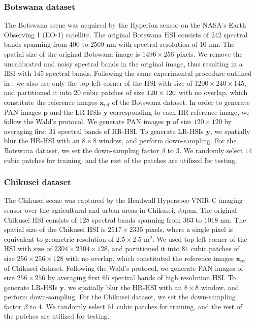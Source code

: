 \documentclass[journal]{IEEEtran}
\begin{document}
        \subsubsection{Botswana dataset} The Botswana scene was acquired by the Hyperion sensor on the NASA's Earth Observing 1 (EO-1) satellite. The original Botswana HSI consists of $242$ spectral bands spanning from $400$ to $2500$ nm with spectral resolution of $10$ nm. The spatial size of the original Botswana image is $1496 \times 256$ pixels. We remove the uncalibrated and noisy spectral bands in the original image, thus resulting in a HSI with $145$ spectral bands. Following the same experimental procedure outlined in \cite{DHP-DARN}, we also use only the top-left corner of the HSI with size of $1200 \times 240 \times 145$, and partitioned it into 20 cubic patches of size $120 \times 120 \time 145$ with no overlap, which constitute the reference images $\mathbf{x}_{\text{ref}}$ of the Botswana dataset. In order to generate PAN images $\mathbf{p}$ and the LR-HSIs $\mathbf{y}$ corresponding to each HR reference image, we follow the Wald's protocol. We generate PAN images $\mathbf{p}$ of size $120 \times 120$ by averaging first $31$ spectral bands of HR-HSI. To generate LR-HSIs $\mathbf{y}$, we spatially blur the HR-HSI with an $8 \times 8$ window, and perform  down-sampling. For the Botswana dataset, we set the down-sampling factor $\beta$ to 3. We randomly select $14$ cubic patches for  training, and the rest of the patches are utilized for  testing.
        
        \subsubsection{Chikusei dataset \cite{Chikusei_dataset}} The Chikusei scene was captured by the Headwall Hyperspec-VNIR-C imaging sensor over the agricultural and urban areas in Chikusei, Japan. The original Chikusei HSI consists of 128 spectral bands spanning from $363$ to $1018$ nm. The spatial size of the Chikusei HSI is $2517 \times 2335$ pixels, where a single pixel is equivalent to geometric resolution of $2.5 \times 2.5 $ m$^2$. We used top-left corner of the HSI with size of $2304 \times 2304 \times 128$, and partitioned it into $81$ cubic patches of size $256 \times 256 \times 128$ with no overlap, which constituted the reference images $\mathbf{x}_{\text{ref}}$ of Chikusei dataset. Following the Wald's protocol, we generate PAN images of size $256 \times 256$ by averaging first $65$ spectral bands of high resolution HSI. To generate LR-HSIs $\mathbf{y}$, we spatially blur the HR-HSI with an $8 \times 8$ window, and perform  down-sampling. For the Chikusei dataset, we set the down-sampling factor $\beta$ to $4$. We randomly select 61 cubic patches for training, and the rest of the patches are utilized for  testing.
        
\end{document}
